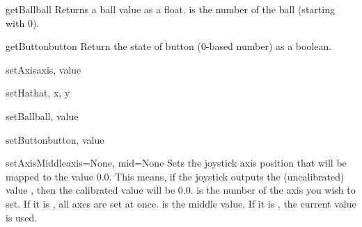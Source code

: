 \begin{methoddesc}{getBall}{ball}
Returns a ball value as a float.  is the number of the ball
(starting with 0).
\end{methoddesc}

\begin{methoddesc}{getButton}{button}
Return the state of button  (0-based number) as a boolean.
\end{methoddesc}

\begin{methoddesc}{setAxis}{axis, value}

\end{methoddesc}

\begin{methoddesc}{setHat}{hat, x, y}
\end{methoddesc}

\begin{methoddesc}{setBall}{ball, value}
\end{methoddesc}

\begin{methoddesc}{setButton}{button, value}
\end{methoddesc}

\begin{methoddesc}{setAxisMiddle}{axis=None, mid=None}
Sets the joystick axis position that will be mapped to the value 0.0.  This
means, if the joystick outputs the (uncalibrated) value , then
the calibrated value will be 0.0.
 is the number of the axis you wish to set. If it is ,
all axes are set at once.  is the middle value. If it is ,
the current value is used.
\end{methoddesc}


